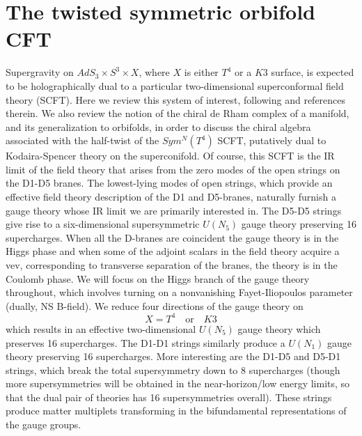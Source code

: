 \documentclass[11pt]{amsart}
\theoremstyle{thm}
\numberwithin{equation}{subsection}
\theoremstyle{def}
\theoremstyle{rem}
\begin{document}
\section{The twisted symmetric orbifold CFT}

Supergravity on $AdS_3 \times S^3 \times X$, where $X$ is either $T^4$ or a $K3$ surface, is expected to be holographically dual to a particular two-dimensional superconformal field theory (SCFT). 
Here we review this system of interest, following \cite{Davidetal} and references therein.
We also review the notion of the chiral de Rham complex of a manifold, and its generalization to orbifolds, in order to discuss the chiral algebra associated with the half-twist of the $Sym^N(T^4)$ SCFT, putatively dual to Kodaira-Spencer theory on the superconifold. Of course, this SCFT is the IR limit of the field theory that arises from the zero modes of the open strings on the D1-D5 branes. 
The lowest-lying modes of open strings, which provide an effective field theory description of the D1 and D5-branes, naturally furnish a gauge theory whose IR limit we are primarily interested in.  
The D5-D5 strings give rise to a six-dimensional supersymmetric $U(N_5)$ gauge theory preserving 16 supercharges. 
When all the D-branes are coincident the gauge theory is in the Higgs phase and when some of the adjoint scalars in the field theory acquire a vev, corresponding to transverse separation of the branes, the theory is in the Coulomb phase. 
We will focus on the Higgs branch of the gauge theory throughout, which involves turning on a nonvanishing Fayet-Iliopoulos parameter (dually, NS B-field). 
We reduce four directions of the gauge theory on 
\[
X = T^4 \quad \text{or} \quad K3
\]
which results in an effective two-dimensional $U(N_5)$ gauge theory which preserves 16 supercharges.
The D1-D1 strings similarly produce a $U(N_1)$ gauge theory preserving 16 supercharges. 
More interesting are the D1-D5 and D5-D1 strings, which break the total supersymmetry down to 8 supercharges (though more supersymmetries will be obtained in the near-horizon/low energy limits, so that the dual pair of theories has 16 supersymmetries overall). 
These strings produce matter multiplets transforming in the bifundamental representations of the gauge groups. 
\end{document}
